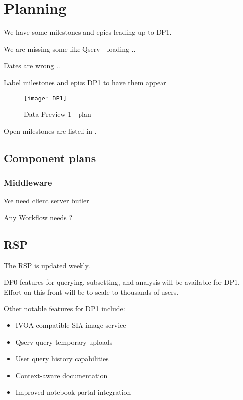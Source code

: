 \section{Planning} \label{sec:plan}

We have some milestones and epics leading up to DP1.

We are missing some like Qserv - loading ..

Dates are wrong ..

Label milestones and epics DP1 to have them appear

\begin{figure}
\begin{centering}
\texttt{[image: DP1]}
	\caption{Data Preview 1 - plan \label{fig:plan}}
\end{centering}
\end{figure}


\newpage
Open milestones are listed in .



\subsection{Component plans}
\subsubsection{Middleware}
We need client server butler 

Any Workflow needs ?

\subsection{RSP}
The RSP is updated weekly.

DP0 features for querying, subsetting, and analysis will be available for DP1.
Effort on this front will be to scale to thousands of users.

Other notable features for DP1 include:

\begin{itemize}
\item IVOA-compatible SIA image service
\item Qserv query temporary uploads
\item User query history capabilities
\item Context-aware documentation
\item Improved  notebook-portal integration
\end{itemize}


